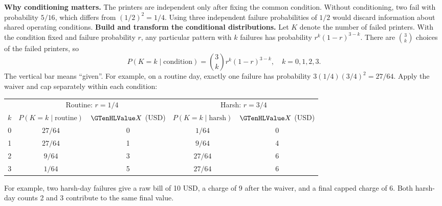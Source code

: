 \textbf{Why conditioning matters.} The printers are independent only after fixing the common condition. Without conditioning, two fail with probability $5/16$, which differs from $(1/2)^2=1/4$. Using three independent failure probabilities of $1/2$ would discard information about shared operating conditions.
\clearpage
\textbf{Build and transform the conditional distributions.} Let $K$ denote the number of failed printers. With the condition fixed and failure probability $r$, any particular pattern with $k$ failures has probability $r^k(1-r)^{3-k}$. There are $\binom{3}{k}$ choices of the failed printers, so
\[
P(K=k\mid\text{condition})=\binom{3}{k}r^k(1-r)^{3-k},\quad k=0,1,2,3.
\]
The vertical bar means ``given''. For example, on a routine day, exactly one failure has probability $3(1/4)(3/4)^2=27/64$. Apply the waiver and cap separately within each condition:
\begin{center}\begin{tabular}{ccccc}\toprule
& \multicolumn{2}{c}{Routine: $r=1/4$} & \multicolumn{2}{c}{Harsh: $r=3/4$} \\
$k$ & $P(K=k\mid\text{routine})$ & $\cTwoValue{X}$ (USD) & $P(K=k\mid\text{harsh})$ & $\cTwoValue{X}$ (USD) \\\midrule
0 & $27/64$ & 0 & $1/64$ & 0 \\
1 & $27/64$ & 1 & $9/64$ & 4 \\
2 & $9/64$ & 3 & $27/64$ & 6 \\
3 & $1/64$ & 5 & $27/64$ & 6 \\\bottomrule
\end{tabular}\end{center}
For example, two harsh-day failures give a raw bill of 10 USD, a charge of 9 after the waiver, and a final capped charge of 6. Both harsh-day counts 2 and 3 contribute to the same final value.

